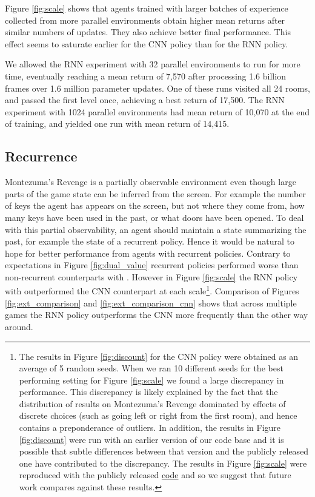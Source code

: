 \documentclass{article} \usepackage[dvipsnames]{xcolor}
\begin{document}
Figure \ref{fig:scale} shows that agents trained with larger batches of experience collected from more parallel environments obtain higher mean returns after similar numbers of updates.  They also achieve better final performance. This effect seems to saturate earlier for the CNN policy than for the RNN policy.

We allowed the RNN experiment with 32 parallel environments to run for more time, eventually reaching a mean return of 7,570 after processing 1.6 billion frames over 1.6 million parameter updates. One of these runs visited all 24 rooms, and passed the first level once, achieving a best return of 17,500. The RNN experiment with 1024 parallel environments had mean return of 10,070 at the end of training, and yielded one run with mean return of 14,415.

\subsection{Recurrence}
\label{sec:cnnrnn}
Montezuma's Revenge is a partially observable environment even though large parts of the game state can be inferred from the screen. For example the number of keys the agent has appears on the screen, but not where they come from, how many keys have been used in the past, or what doors have been opened. To deal with this partial observability, an agent should maintain a state summarizing the past, for example the state of a recurrent policy. Hence it would be natural to hope for better performance from agents with recurrent policies. Contrary to expectations in Figure \ref{fig:dual_value} recurrent policies performed worse than non-recurrent counterparts with . However in Figure \ref{fig:scale} the RNN policy with  outperformed the CNN counterpart at each scale\footnote{The results in Figure \ref{fig:discount} for the CNN policy were obtained as an average of 5 random seeds. When we ran 10 different seeds for the best performing setting for Figure \ref{fig:scale} we found a large discrepancy in performance. This discrepancy is likely explained by the fact that the distribution of results on Montezuma's Revenge dominated by effects of discrete choices (such as going left or right from the first room), and hence contains a preponderance of outliers. In addition, the results in Figure \ref{fig:discount} were run with an earlier version of our code base and it is possible that subtle differences between that version and the publicly released one have contributed to the discrepancy. The results in Figure \ref{fig:scale} were reproduced with the publicly released \href{https://github.com/openai/random-network-distillation}{code} and so we suggest that future work compares against these results.}. Comparison of Figures \ref{fig:ext_comparison} and \ref{fig:ext_comparison_cnn} shows that across multiple games the RNN policy outperforms the CNN more frequently than the other way around.
\end{document}

